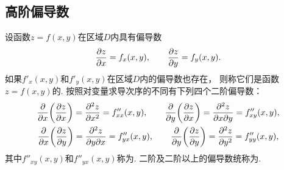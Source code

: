 \subsection{高阶偏导数}
\begin{definition}
设函数\(z=f(x,y)\)在区域\(D\)内具有偏导数\[
	\pdv{z}{x} = f_x(x,y), \qquad
	\pdv{z}{y} = f_y(x,y).
\]
如果\(f'_x(x,y)\)和\(f'_y(x,y)\)在区域\(D\)内的偏导数也存在，
则称它们是函数\(z=f(x,y)\)的.
按照对变量求导次序的不同有下列四个二阶偏导数：
\begin{gather*}
	\pdv{x}(\pdv{z}{x}) = \pdv[2]{z}{x} = f''_{xx}(x,y),
	\qquad
	\pdv{y}(\pdv{z}{x}) = \pdv{z}{x}{y} = f''_{xy}(x,y), \\
	\pdv{x}(\pdv{z}{y}) = \pdv{z}{y}{x} = f''_{yx}(x,y),
	\qquad
	\pdv{y}(\pdv{z}{y}) = \pdv[2]{z}{y} = f''_{yy}(x,y),
\end{gather*}
其中\(f''_{xy}(x,y)\)和\(f''_{yx}(x,y)\)称为.
二阶及二阶以上的偏导数统称为.
\end{definition}

